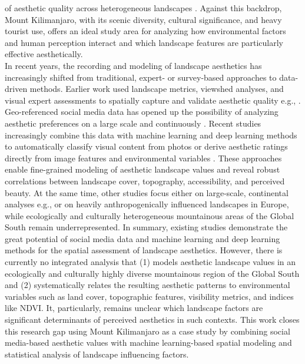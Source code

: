 \documentclass[hidelinks, 11pt]{article}
\begin{document}
of aesthetic quality across heterogeneous landscapes \citep{schirpke_predicting_2013}. Against this backdrop, Mount Kilimanjaro, with its scenic diversity, cultural significance, and heavy tourist use, offers an ideal study area for analyzing how environmental factors and human perception interact and which landscape features are particularly effective aesthetically. \\
In recent years, the recording and modeling of landscape aesthetics has increasingly shifted from traditional, expert- or survey-based approaches to data-driven methods. Earlier work used landscape metrics, viewshed analyses, and visual expert assessments to spatially capture and validate aesthetic quality e.g., \citep{frank_assessment_2013,schirpke_predicting_2013,lee_application_2019}. Geo-referenced social media data has opened up the possibility of analyzing aesthetic preferences on a large scale and continuously \citep{langemeyer_mapping_2018,tieskens_aesthetic_2018}.
Recent studies increasingly combine this data with machine learning and deep learning methods to automatically classify visual content from photos or derive aesthetic ratings directly from image features and environmental variables \citep{cardoso_classifying_2022,gosal_landscape_2020,havinga_social_2021}. These approaches enable fine-grained modeling of aesthetic landscape values and reveal robust correlations between landscape cover, topography, accessibility, and perceived beauty. At the same time, other studies focus either on large-scale, continental analyses e.g., \citep{van_zanten_continental-scale_2016} or on heavily anthropogenically influenced landscapes in Europe, while ecologically and culturally heterogeneous mountainous areas of the Global South remain underrepresented.
In summary, existing studies demonstrate the great potential of social media data and machine learning and deep learning methods for the spatial assessment of landscape aesthetics. However, there is currently no integrated analysis that (1) models aesthetic landscape values in an ecologically and culturally highly diverse mountainous region of the Global South and (2) systematically relates the resulting aesthetic patterns to environmental variables such as land cover, topographic features, visibility metrics, and indices like NDVI. It, particularly, remains unclear which landscape factors are significant determinants of perceived aesthetics in such contexts. This work closes this research gap using Mount Kilimanjaro as a case study by combining social media-based aesthetic values with machine learning-based spatial modeling and statistical analysis of landscape influencing factors.
\end{document}
